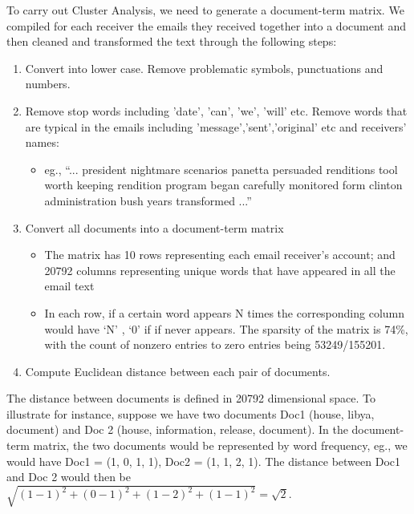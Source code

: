 To carry out Cluster Analysis, we need to generate a document-term matrix. 
We compiled for each receiver the emails they received together into a document and then cleaned and transformed the text through the following steps:
\begin{enumerate}
\item Convert into lower case. Remove problematic symbols, punctuations and numbers.
\item Remove stop words including 'date', 'can', 'we', 'will' etc. Remove words that are typical in the emails including 'message','sent','original' etc and receivers' names:
\begin{itemize}
\item eg., ``... president nightmare scenarios panetta persuaded renditions tool worth keeping rendition program began carefully monitored form clinton administration bush years transformed ...''
\end{itemize}
\item Convert all documents into a document-term matrix
\begin{itemize} 
\item The matrix has 10 rows representing each email receiver's account; and 20792 columns representing unique words that have appeared in all the email text
\item In each row, if a certain word appears N times the corresponding column would have `N' , `0' if if never appears. The sparsity of the matrix is 74\%, with the count of nonzero entries to zero entries being 53249/155201. 
\end{itemize}
\item Compute Euclidean distance between each pair of documents.
\end{enumerate}
The distance between documents is defined in 20792 dimensional space. To illustrate for instance, suppose we have two documents Doc1 (house, libya, document) and Doc 2 (house, information, release, document). In the document-term matrix, the two documents would be represented by word frequency, eg., we would have Doc1 = (1, 0, 1, 1), Doc2 = (1, 1, 2, 1). The distance between Doc1 and Doc 2 would then be $\sqrt{(1-1)^{2} + (0-1)^{2} + (1-2)^{2} + (1-1)^{2}} = \sqrt{2}$.

